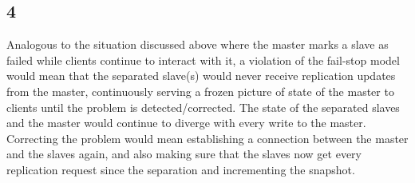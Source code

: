 \documentclass[12pt]{article}
\begin{document}
\subsection*{4}
Analogous to the situation discussed above where the master marks a slave as failed while clients continue to interact with it, a violation of the fail-stop model would mean that the separated slave(s) would never receive replication updates from the master, continuously serving a frozen picture of state of the master to clients until the problem is detected/corrected. The state of the separated slaves and the master would continue to diverge with every write to the master. Correcting the problem would mean establishing a connection between the master and the slaves again, and also making sure that the slaves now get every replication request since the separation and incrementing the snapshot.
\end{document}
